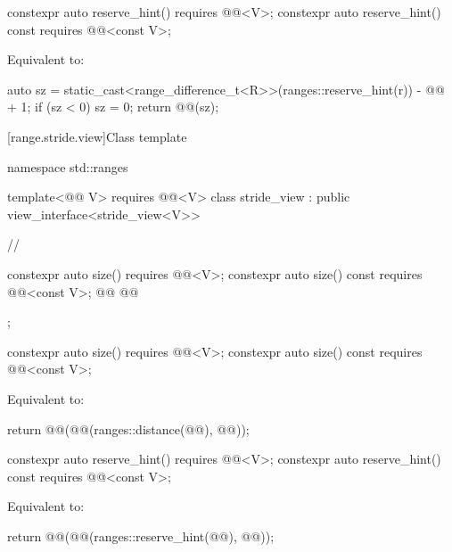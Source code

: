 \documentclass{wg21}
\begin{document}
\begin{addedblock}
\begin{itemdecl}
    constexpr auto reserve_hint() requires @@<V>;
    constexpr auto reserve_hint() const requires @@<const V>;
\end{itemdecl}

\begin{itemdescr}
    \pnum
    \effects
    Equivalent to:
    \begin{codeblock}
        auto sz = static_cast<range_difference_t<R>>(ranges::reserve_hint(r)) - @@ + 1;
        if (sz < 0) sz = 0;
        return @@(sz);
    \end{codeblock}
\end{itemdescr}
\end{addedblock}

[range.stride.view]{Class template }

\begin{codeblock}
namespace std::ranges {
template<@@ V>
requires @@<V>
class stride_view : public view_interface<stride_view<V>> {
    //

    constexpr auto size() requires @@<V>;
    constexpr auto size() const requires @@<const V>;
    @@
    @@
};
}
\end{codeblock}

\begin{itemdecl}
    constexpr auto size() requires @@<V>;
    constexpr auto size() const requires @@<const V>;
\end{itemdecl}

\begin{itemdescr}
    \pnum
    \effects
    Equivalent to:
    \begin{codeblock}
        return @@(@@(ranges::distance(@@), @@));
    \end{codeblock}
\end{itemdescr}

\begin{addedblock}
\begin{itemdecl}
    constexpr auto reserve_hint() requires @@<V>;
    constexpr auto reserve_hint() const requires @@<const V>;
\end{itemdecl}

\begin{itemdescr}
\pnum
\effects
Equivalent to:
\begin{codeblock}
    return @@(@@(ranges::reserve_hint(@@), @@));
\end{codeblock}
\end{itemdescr}
\end{addedblock}
\end{document}
